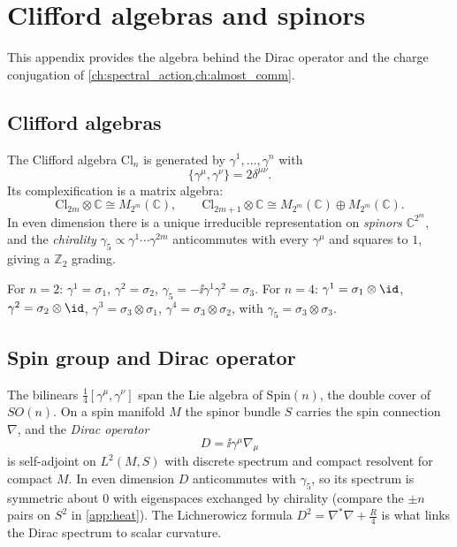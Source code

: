 \chapter{Clifford algebras and spinors}\label{app:clifford}
This appendix provides the algebra behind the Dirac operator and the charge conjugation of \cref{ch:spectral_action,ch:almost_comm}.

\section{Clifford algebras}
The Clifford algebra $\mathrm{Cl}_n$ is generated by $\gamma^1,\dots,\gamma^n$ with
\begin{equation}
\{\gamma^\mu,\gamma^\nu\}=2\delta^{\mu\nu}.
\end{equation}
Its complexification is a matrix algebra:
\[
\mathrm{Cl}_{2m}\otimes\mathbb C\cong M_{2^m}(\mathbb C),\qquad
\mathrm{Cl}_{2m+1}\otimes\mathbb C\cong M_{2^m}(\mathbb C)\oplus M_{2^m}(\mathbb C).
\]
In even dimension there is a unique irreducible representation on \emph{spinors} $\mathbb C^{2^m}$, and the \emph{chirality} $\gamma_5\propto\gamma^1\cdots\gamma^{2m}$ anticommutes with every $\gamma^\mu$ and squares to $1$, giving a $\mathbb Z_2$ grading.

\begin{example}
For $n=2$: $\gamma^1=\sigma_1$, $\gamma^2=\sigma_2$, $\gamma_5=-\ii\gamma^1\gamma^2=\sigma_3$. For $n=4$: $\gamma^1=\sigma_1\otimes\id$, $\gamma^2=\sigma_2\otimes\id$, $\gamma^3=\sigma_3\otimes\sigma_1$, $\gamma^4=\sigma_3\otimes\sigma_2$, with $\gamma_5=\sigma_3\otimes\sigma_3$.
\end{example}

\section{Spin group and Dirac operator}
The bilinears $\tfrac14[\gamma^\mu,\gamma^\nu]$ span the Lie algebra of $\mathrm{Spin}(n)$, the double cover of $SO(n)$. On a spin manifold $M$ the spinor bundle $S$ carries the spin connection $\nabla$, and the \emph{Dirac operator}
\begin{equation}
D=\ii\gamma^\mu\nabla_\mu
\end{equation}
is self-adjoint on $L^2(M,S)$ with discrete spectrum and compact resolvent for compact $M$. In even dimension $D$ anticommutes with $\gamma_5$, so its spectrum is symmetric about $0$ with eigenspaces exchanged by chirality (compare the $\pm n$ pairs on $S^2$ in \cref{app:heat}). The Lichnerowicz formula $D^2=\nabla^*\nabla+\tfrac R4$ is what links the Dirac spectrum to scalar curvature.

